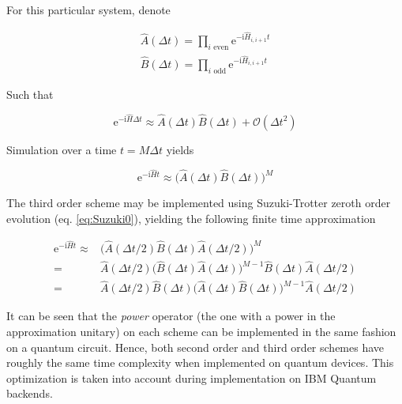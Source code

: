   For this particular system, denote

  \begin{gather}
    \hat{A}(\Delta t) = \prod_{i \text{ even}} \mathrm{e}^{-\mathrm{i}\hat{H}_{i,i+1}t} \\
    \hat{B}(\Delta t) = \prod_{i \text{ odd}} \mathrm{e}^{-\mathrm{i}\hat{H}_{i,i+1}t}
    \label{eq:ChainOpsTrotter}
  \end{gather}

  Such that

  \begin{equation}
    \mathrm{e}^{-\mathrm{i}\hat{H}\Delta t} \approx \hat{A}(\Delta t) \hat{B}(\Delta t) + \mathcal{O}(\Delta t^2)
    \label{eq:HamiltonianTrotterization}
  \end{equation}

  Simulation over a time $t = M \Delta t$ yields

  \begin{equation}
    \mathrm{e}^{-\mathrm{i}\hat{H}t} \approx \bigg( \hat{A}(\Delta t) \hat{B}(\Delta t) \bigg)^{M}
    \label{eq:HamiltonianTrotterization}
  \end{equation}

  The third order scheme may be implemented using Suzuki-Trotter zeroth order evolution (eq. \ref{eq:Suzuki0}), yielding the following finite time approximation

  \begin{equation}
    \begin{aligned}
      \mathrm{e}^{-\mathrm{i}\hat{H}t} \approx & \bigg( \hat{A}(\Delta t/2) \hat{B}(\Delta t) \hat{A}(\Delta t/2) \bigg)^{M} \\
    = &  \hat{A}(\Delta t/2) \bigg( \hat{B}(\Delta t) \hat{A}(\Delta t) \bigg)^{M-1} \hat{B}(\Delta t) \hat{A}(\Delta t/2) \\
    = & \hat{A}(\Delta t/2) \hat{B}(\Delta t) \bigg( \hat{A}(\Delta t) \hat{B}(\Delta t) \bigg)^{M-1} \hat{A}(\Delta t/2)
    \label{eq:HamiltonianTrotterization}
    \end{aligned}
  \end{equation}

  It can be seen that the \textit{power} operator (the one with a power in the approximation unitary) on each scheme can be implemented in the same fashion on a quantum circuit. Hence, both second order and third order schemes have roughly the same time complexity when implemented on quantum devices. This optimization is taken into account during implementation on IBM Quantum backends.
  

